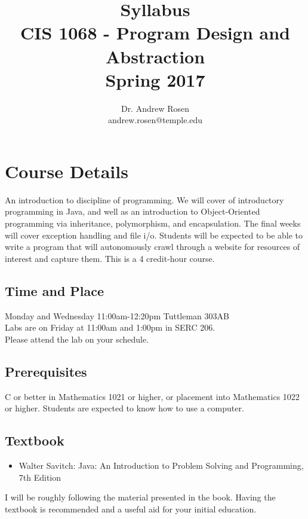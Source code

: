 \documentclass[10pt, letter]{article}
\title{Syllabus \\ CIS 1068 - Program Design and Abstraction  \\ Spring 2017}
\author{Dr. Andrew Rosen  \\ andrew.rosen@temple.edu}
\date{}
\begin{document}
\maketitle

\section{Course Details}

An introduction to discipline of programming.  We will cover of introductory programming in Java, and well as an introduction to Object-Oriented programming via inheritance, polymorphism, and encapsulation.  The final weeks will cover exception handling and file i/o.
Students will be expected to be able to write a program that will autonomously crawl through a website for resources of interest and capture them.
This is a 4 credit-hour course.




\subsection*{Time and Place}
Monday and Wednesday 11:00am-12:20pm Tuttleman 303AB
\\
Labs are on Friday at 11:00am and 1:00pm in SERC 206.
\\
Please attend the lab on your schedule.


\subsection*{Prerequisites}
C or better in Mathematics 1021 or higher, or placement into Mathematics 1022 or higher. 
Students are expected to know how to use a computer.



\subsection*{Textbook}
\begin{itemize}
	\item Walter Savitch: Java: An Introduction to Problem Solving and Programming, 7th Edition
\end{itemize}

I will be roughly following the material presented in the book.
Having the textbook is recommended and a useful aid for your initial education.
\end{document}
